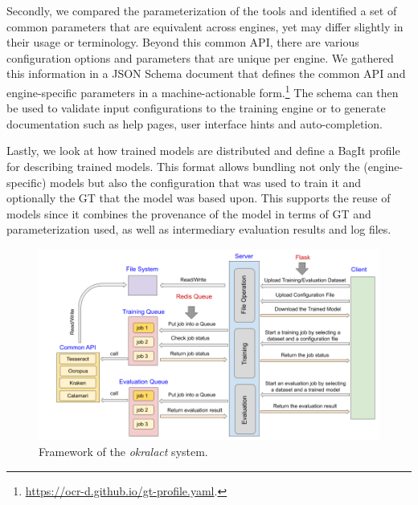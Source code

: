 \documentclass[conference]{IEEEtran}
\begin{document}
Secondly, we compared the parameterization of the tools and
identified a set of common parameters that are equivalent across
engines, yet may differ slightly in their usage or terminology.
Beyond this common API, there are various configuration options and
parameters that are unique per engine. We gathered this information
in a JSON Schema document that defines the common API and
engine-specific parameters in a machine-actionable
form.\footnote{\url{https://ocr-d.github.io/gt-profile.yaml}.} The
schema can then be used to validate input configurations to the
training engine or to generate documentation such as help pages,
user interface hints and auto-completion.

Lastly, we look at how trained models are distributed and
define a BagIt \cite{kunze2018bagit} profile for describing trained models. 
This format allows bundling not only the (engine-specific) models but
also the configuration that was used to train it and optionally the
GT that the model was based upon. This supports the reuse of models 
since it combines the provenance of the model in terms of GT and 
parameterization used, as well as  intermediary evaluation results and 
log files.


\begin{figure}[ht!]
    \begin{center}
        \includegraphics[width=1\linewidth]{Figures/Framework.png}
    \end{center}
    \caption{Framework of the \textit{okralact} system.}
    \label{fig:framework}
\end{figure}
\end{document}
